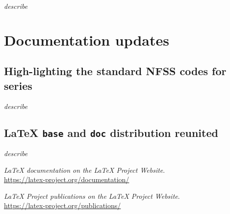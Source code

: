 \documentclass{ltnews}
\begin{document}
\emph{describe}



\section{Documentation updates}

\subsection{High-lighting the standard NFSS codes for series}

\emph{describe}


\subsection{\LaTeX{} \texttt{base} and \texttt{doc} distribution reunited}
      
\emph{describe}


\begin{thebibliography}{9}
  
  \emph{\LaTeX{} documentation on the \LaTeX{} Project Website}.\\  
  \url{https://latex-project.org/documentation/}

  \emph{\LaTeX{} Project publications on the \LaTeX{} Project Website}.\\
  \url{https://latex-project.org/publications/}

\end{thebibliography}
\end{document}
